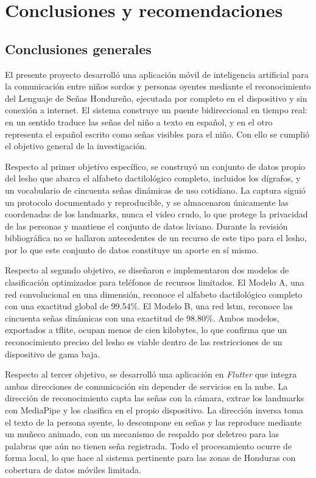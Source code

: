 \chapter[Conclusiones y recomendaciones]{Conclusiones y recomendaciones}
\label{chap:conclusiones}

\insertminitoc
\parindent0pt

\section{Conclusiones generales}

El presente proyecto desarrolló una aplicación móvil de inteligencia artificial para la comunicación entre niños sordos y personas oyentes mediante el reconocimiento del Lenguaje de Señas Hondureño, ejecutada por completo en el dispositivo y sin conexión a internet. El sistema construye un puente bidireccional en tiempo real: en un sentido traduce las señas del niño a texto en español, y en el otro representa el español escrito como señas visibles para el niño. Con ello se cumplió el objetivo general de la investigación.

Respecto al primer objetivo específico, se construyó un conjunto de datos propio del \Acrshort{lesho} que abarca el alfabeto dactilológico completo, incluidos los dígrafos, y un vocabulario de cincuenta señas dinámicas de uso cotidiano. La captura siguió un protocolo documentado y reproducible, y se almacenaron únicamente las coordenadas de los landmarks, nunca el video crudo, lo que protege la privacidad de las personas y mantiene el conjunto de datos liviano. Durante la revisión bibliográfica no se hallaron antecedentes de un recurso de este tipo para el \Acrshort{lesho}, por lo que este conjunto de datos constituye un aporte en sí mismo.

Respecto al segundo objetivo, se diseñaron e implementaron dos modelos de clasificación optimizados para teléfonos de recursos limitados. El Modelo A, una red convolucional en una dimensión, reconoce el alfabeto dactilológico completo con una exactitud global de 99.54\%. El Modelo B, una red \Acrshort{lstm}, reconoce las cincuenta señas dinámicas con una exactitud de 98.80\%. Ambos modelos, exportados a \Acrshort{tflite}, ocupan menos de cien kilobytes, lo que confirma que un reconocimiento preciso del \Acrshort{lesho} es viable dentro de las restricciones de un dispositivo de gama baja.

Respecto al tercer objetivo, se desarrolló una aplicación en \textit{Flutter} que integra ambas direcciones de comunicación sin depender de servicios en la nube. La dirección de reconocimiento capta las señas con la cámara, extrae los landmarks con MediaPipe y los clasifica en el propio dispositivo. La dirección inversa toma el texto de la persona oyente, lo descompone en señas y las reproduce mediante un muñeco animado, con un mecanismo de respaldo por deletreo para las palabras que aún no tienen seña registrada. Todo el procesamiento ocurre de forma local, lo que hace al sistema pertinente para las zonas de Honduras con cobertura de datos móviles limitada.

